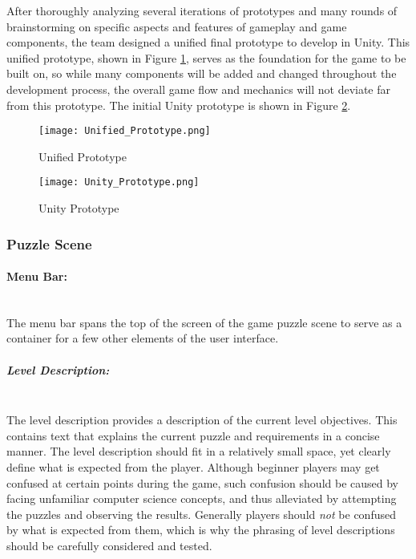 

After thoroughly analyzing several iterations of prototypes and many rounds of brainstorming on specific aspects and features of gameplay and game components, the team designed a unified final prototype to develop in Unity.
This unified prototype, shown in Figure \ref{fig:Unified_Prototype}, serves as the foundation for the game to be built on, so while many components will be added and changed throughout the development process, the overall game flow and mechanics will not deviate far from this prototype. The initial Unity prototype is shown in Figure \ref{fig:Unity_Prototype}.


\begin{figure}[H]
  \caption{Unified Prototype}
  \label{fig:Unified_Prototype}
  \centering
  \texttt{[image: Unified\_Prototype.png]}
\end{figure}


\begin{figure}[H]
  \caption{Unity Prototype}
  \label{fig:Unity_Prototype}
  \centering
  \texttt{[image: Unity\_Prototype.png]}
\end{figure}










\subsubsection{Puzzle Scene}

	\paragraph{Menu Bar:} ~\\
	The menu bar spans the top of the screen of the game puzzle scene to serve as a container for a few other elements of the user interface.

		\subparagraph{Level Description:} ~\\
		The level description provides a description of the current level objectives. This contains text that explains the current puzzle and requirements in a concise manner. The level description should fit in a relatively small space, yet clearly define what is expected from the player.
		Although beginner players may get confused at certain points during the game, such confusion should be caused by facing unfamiliar computer science concepts, and thus alleviated by attempting the puzzles and observing the results. Generally players should \textit{not} be confused by what is expected from them, which is why the phrasing of level descriptions should be carefully considered and tested.

